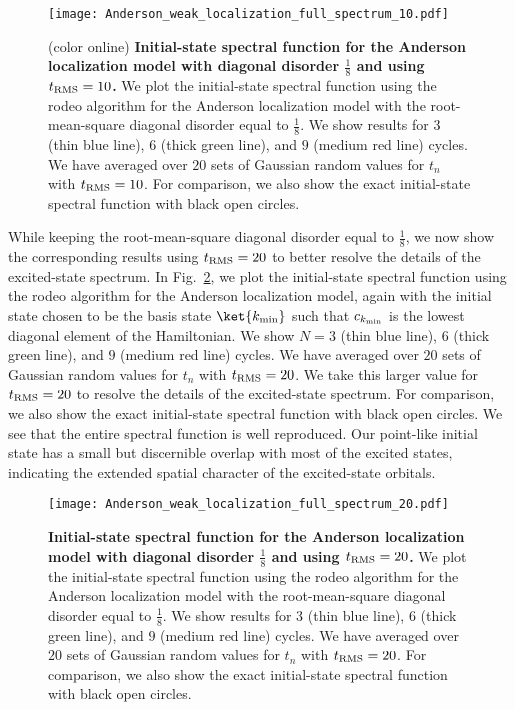 \begin{figure}
\centering
\texttt{[image: Anderson\_weak\_localization\_full\_spectrum\_10.pdf]}
\caption{(color online) {\bf Initial-state spectral function for the Anderson localization model with diagonal disorder $\tfrac{1}{8}$ and using $t_{\rm RMS}=10$.} We plot the initial-state spectral function using the rodeo algorithm for the Anderson localization model with the root-mean-square diagonal disorder equal to $\tfrac{1}{8}$.  We show results for $3$ (thin blue line), $6$ (thick green line), and $9$ (medium red line) cycles. We have averaged over $20$ sets of Gaussian random values for $t_n$ with $t_{\rm RMS}=10$.  For comparison, we also show the exact initial-state spectral function with black open circles.}
\label{Anderson_weak_spectrum_10}
\end{figure} 

While keeping the root-mean-square diagonal disorder equal to $\tfrac{1}{8}$, we now show the corresponding results using $t_{\rm RMS}=20$ to better resolve the details of the excited-state spectrum.
In Fig.~\ref{Anderson_weak_spectrum_20}, we plot the initial-state spectral function using the rodeo algorithm for the Anderson localization model, again with the initial state chosen to be the basis state $\ket{k_{\rm min}}$ such that $c_{k_{\rm min}}$ is the lowest diagonal element of the Hamiltonian. We show $N=3$ (thin blue line), $6$ (thick green line), and $9$ (medium red line) cycles. We have averaged over $20$ sets of Gaussian random values for $t_n$ with $t_{\rm RMS}=20$.  We take this larger value for $t_{\rm RMS}=20$ to resolve the details of the excited-state spectrum.  For comparison, we also show the exact initial-state spectral function with black open circles.  We see that the entire spectral function is well reproduced.  Our point-like initial state has a small but discernible overlap with most of the excited states, indicating the extended spatial character of the excited-state orbitals.  
\begin{figure}
\centering
\texttt{[image: Anderson\_weak\_localization\_full\_spectrum\_20.pdf]}
\caption{{\bf Initial-state spectral function for the Anderson localization model with diagonal disorder $\tfrac{1}{8}$ and using $t_{\rm RMS}=20$.} We plot the initial-state spectral function using the rodeo algorithm for the Anderson localization model with the root-mean-square diagonal disorder equal to $\tfrac{1}{8}$.  We show results for $3$ (thin blue line), $6$ (thick green line), and $9$ (medium red line) cycles. We have averaged over $20$ sets of Gaussian random values for $t_n$ with $t_{\rm RMS}=20$.  For comparison, we also show the exact initial-state spectral function with black open circles.}
\label{Anderson_weak_spectrum_20}
\end{figure} 



